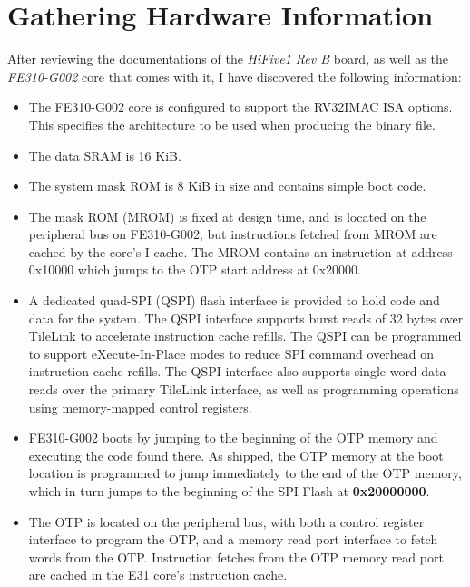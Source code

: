 \documentclass[a4paper,12pt,twoside]{report}
\begin{document}
            \section{Gathering Hardware Information}
            After reviewing the documentations of the \textit{HiFive1 Rev B} board, as well as the \textit{FE310-G002} core that comes with it, I have discovered the following information:
            \begin{itemize}
            	\item The FE310-G002 core is configured to support the RV32IMAC ISA options. This specifies the architecture to be used when producing the binary file.\cite{hifive1RevBConfig}

				\item The data SRAM is 16 KiB.\cite{hifive1RevBConfig}

            	\item The system mask ROM is 8 KiB in size and contains simple boot code.\cite{hifive1RevBConfig}
            	
            	\item The mask ROM (MROM) is fixed at design time, and is located on the peripheral bus on FE310-G002, but instructions fetched from MROM are cached by the core’s I-cache. The MROM contains an instruction
at address 0x10000 which jumps to the OTP start address at 0x20000.\cite{fe310g002manBootProcess}
            	
            	\item A dedicated quad-SPI (QSPI) flash interface is provided to hold code and data for the system.
The QSPI interface supports burst reads of 32 bytes over TileLink to accelerate instruction cache
refills. The QSPI can be programmed to support eXecute-In-Place modes to reduce SPI command
overhead on instruction cache refills. The QSPI interface also supports single-word data reads over the primary TileLink interface, as well as programming operations using memory-mapped
control registers.\cite{hifive1RevBConfig}
            	
            	\item FE310-G002 boots by jumping to the beginning of the OTP memory and executing the code found there. As shipped, the OTP memory at the boot location is programmed to jump immediately to the end of the OTP memory, which in turn jumps to the beginning of the SPI Flash at \textbf{0x20000000}.\cite{hifive1RevBBootCode}
            	
            	\item The OTP is located on the peripheral bus, with both a control register interface to program the
OTP, and a memory read port interface to fetch words from the OTP. Instruction fetches from the
OTP memory read port are cached in the E31 core’s instruction cache.\cite{fe310g002manBootProcess}
            	

\end{itemize}
\end{document}
